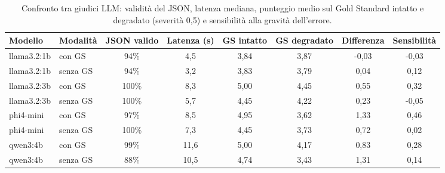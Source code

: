 \begin{table}[htbp]
  \centering
  \small
  \begin{tabular}{llcccccc}
    \toprule
    \textbf{Modello} & \textbf{Modalità} & \textbf{JSON valido} & \textbf{Latenza (s)} & \textbf{GS intatto} & \textbf{GS degradato} & \textbf{Differenza} & \textbf{Sensibilità} \\
    \midrule
    llama3.2:1b & con GS & 94\% & 4,5 & 3,84 & 3,87 & -0,03 & -0,03 \\
    llama3.2:1b & senza GS & 94\% & 3,2 & 3,83 & 3,79 & 0,04 & 0,12 \\
    llama3.2:3b & con GS & 100\% & 8,3 & 5,00 & 4,45 & 0,55 & 0,32 \\
    llama3.2:3b & senza GS & 100\% & 5,7 & 4,45 & 4,22 & 0,23 & -0,05 \\
    phi4-mini & con GS & 97\% & 8,5 & 4,95 & 3,62 & 1,33 & 0,46 \\
    phi4-mini & senza GS & 100\% & 7,3 & 4,45 & 3,73 & 0,72 & 0,02 \\
    qwen3:4b & con GS & 99\% & 11,6 & 5,00 & 4,17 & 0,83 & 0,28 \\
    qwen3:4b & senza GS & 88\% & 10,5 & 4,74 & 3,43 & 1,31 & 0,14 \\
    \bottomrule
  \end{tabular}
  \caption{Confronto tra giudici LLM: validità del JSON, latenza mediana, punteggio medio sul Gold Standard intatto e degradato (severità 0,5) e sensibilità alla gravità dell'errore.}
  \label{tab:judges}
\end{table}
